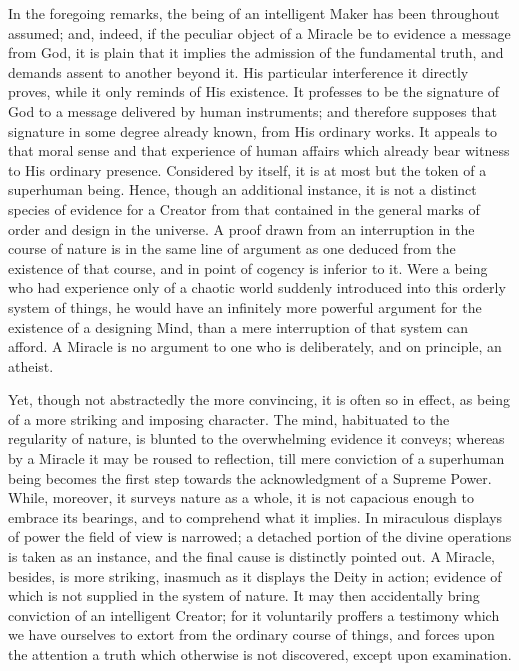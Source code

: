 In the foregoing remarks, the being of an
intelligent Maker has been throughout assumed; and, indeed, if the
peculiar object of a Miracle be to evidence a message from God, it is
plain that it implies the admission of the fundamental truth, and
demands assent to another beyond it. His particular interference it
directly proves, while it only reminds of His existence. It professes
to be the signature of God to a message delivered by human
instruments; and therefore supposes that signature in some degree
already known, from His ordinary works. It appeals to that moral sense
and that experience of human affairs which already bear witness to His
ordinary presence. Considered by itself, it is at most but the token
of a superhuman being. Hence, though an additional instance, it is not
a distinct species of evidence for a Creator from that contained
in the general marks of order and design in the universe. A proof
drawn from an interruption in the course of nature is in the same line
of argument as one deduced from the existence of that course, and in
point of cogency is inferior to it. Were a being who had experience
only of a chaotic world suddenly introduced into this orderly system
of things, he would have an infinitely more powerful argument for the
existence of a designing Mind, than a mere interruption of that system
can afford. A Miracle is no argument to one who is deliberately, and
on principle, an atheist.

Yet, though not abstractedly the more convincing,
it is often so in effect, as being of a more striking and imposing
character. The mind, habituated to the regularity of nature, is
blunted to the overwhelming evidence it conveys; whereas by a Miracle
it may be roused to reflection, till mere conviction of a superhuman
being becomes the first step towards the acknowledgment of a Supreme
Power. While, moreover, it surveys nature as a whole, it is not
capacious enough to embrace its bearings, and to comprehend what it
implies. In miraculous displays of power the field of view is
narrowed; a detached portion of the divine operations is taken as an
instance, and the final cause is distinctly pointed out. A Miracle,
besides, is more striking, inasmuch as it displays the Deity in
action; evidence of which is not supplied in the system of
nature. It may then accidentally bring conviction of an intelligent
Creator; for it voluntarily proffers a testimony which we have
ourselves to extort from the ordinary course of things, and forces
upon the attention a truth which otherwise is not discovered, except
upon examination.

